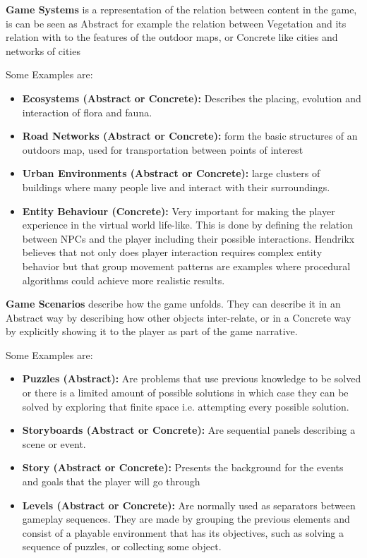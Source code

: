 \documentclass[runningheads]{llncs}
\begin{document}
\textbf{Game Systems} is a representation of the relation between content in the game, is can be seen as Abstract for example the relation between Vegetation and its relation with to the features of the outdoor maps, or Concrete like cities and networks of cities

Some Examples are:
\begin{itemize}
    \item\textbf{Ecosystems (Abstract or Concrete):} Describes the placing, evolution and interaction of flora and fauna.
    
    \item\textbf{Road Networks (Abstract or Concrete):} form the basic structures of an outdoors map, used for transportation between points of interest
    
    \item\textbf{Urban Environments (Abstract or Concrete):} large clusters of buildings where many people live and interact with their surroundings. 
    
    \item\textbf{Entity Behaviour (Concrete):} Very important for making the player experience in the virtual world life-like. This is done by defining the relation between NPCs and the player including their possible interactions. Hendrikx believes that not only does player interaction requires complex entity behavior but that group movement patterns are examples where procedural algorithms could achieve more realistic results.
\end{itemize}

\textbf{Game Scenarios} describe how the game unfolds. They can describe it in an Abstract way by describing how other objects inter-relate, or in a Concrete way by explicitly showing it to the player as part of the game narrative.

Some Examples are:
\begin{itemize}
    \item\textbf{Puzzles (Abstract):} Are problems that use previous knowledge to be solved or there is a limited amount of possible solutions in which case they can be solved by exploring that finite space i.e. attempting every possible solution.
    
    \item\textbf{Storyboards (Abstract or Concrete):} Are sequential panels describing a scene or event.
    
    \item\textbf{Story (Abstract or Concrete):} Presents the background for the events and goals that the player will go through
    
    \item\textbf{Levels (Abstract or Concrete):} Are normally used as separators between gameplay sequences. They are made by grouping the previous elements and consist of a playable environment that has its objectives, such as solving a sequence of puzzles, or collecting some object.
\end{itemize}
\end{document}
